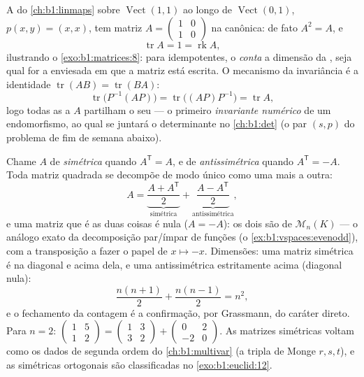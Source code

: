 \begin{example}
\label{ex:b1:matrices:tracework}
A  do \cref{ch:b1:linmaps} sobre $\operatorname{Vect}(1,1)$ ao longo de $\operatorname{Vect}(0,1)$, $p(x, y) = (x, x)$, tem matriz
$A = \begin{pmatrix} 1 & 0\\ 1 &
0\end{pmatrix}$ na  canônica: de fato $A^2 = A$, e
\[
\operatorname{tr} A = 1 = \operatorname{rk} A ,
\]
ilustrando o \cref{exo:b1:matrices:8}: para idempotentes, o  \emph{conta} a
dimensão da , seja qual for a  enviesada em que a matriz
está escrita. O mecanismo da invariância é a identidade $\operatorname{tr}(AB) = \operatorname{tr}(BA)$:
\[
\operatorname{tr}\bigl(P^{-1}(AP)\bigr) =
\operatorname{tr}\bigl((AP)P^{-1}\bigr) = \operatorname{tr} A ,
\]
logo todas as  a $A$ partilham o seu  --- o
primeiro \emph{invariante numérico} de um endomorfismo, ao qual se
juntará o determinante no \cref{ch:b1:det} (o par $(s, p)$ do problema de fim
de semana abaixo).
\end{example}

\begin{example}
\label{ex:b1:matrices:symsplit}
Chame $A$ de \emph{simétrica} quando $A^{\mathsf T} = A$, e de
\emph{antissimétrica} quando $A^{\mathsf T} = -A$. Toda matriz quadrada se decompõe
de modo único como uma mais a outra:
\[
A = \underbrace{\frac{A + A^{\mathsf T}}{2}}_{\text{simétrica}}
+ \underbrace{\frac{A - A^{\mathsf T}}{2}}_{\text{antissimétrica}},
\]
e uma matriz que é as duas coisas é nula ($A = -A$): os dois
 são  de $\mathcal{M}_n(K)$ --- o análogo exato
da decomposição par/ímpar de funções (o \cref{ex:b1:vspaces:evenodd}), com a transposição a
fazer o papel de $x \mapsto -x$. Dimensões: uma matriz simétrica é  na
diagonal e acima dela, e uma antissimétrica estritamente acima
(diagonal nula):
\[
\frac{n(n+1)}{2} + \frac{n(n-1)}{2} = n^2 ,
\]
e o fechamento da contagem é a confirmação, por Grassmann, do
caráter direto. Para $n = 2$: $\begin{pmatrix} 1 & 5\\ 1 &
2\end{pmatrix} = \begin{pmatrix} 1 & 3\\ 3 & 2\end{pmatrix} +
\begin{pmatrix} 0 & 2\\ -2 & 0\end{pmatrix}$. As matrizes simétricas voltam
como os dados de segunda ordem do \cref{ch:b1:multivar} (a tripla de Monge $r, s,
t$), e as simétricas ortogonais são classificadas no \cref{exo:b1:euclid:12}.
\end{example}

